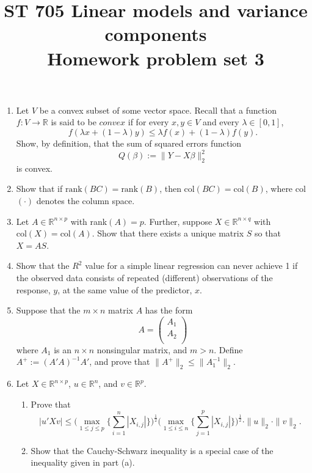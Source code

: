 \documentclass[11pt]{article}
\title{ST 705 Linear models and variance components \\ 
        Homework problem set 3}
\begin{document}
\maketitle

\begin{enumerate}

\item Let $V$ be a convex subset of some vector space.  Recall that a function $f : V \to \mathbb{R}$ is said to be $convex$ if for every $x, y \in V$ and every $\lambda \in [0,1]$,
\[
f(\lambda x + (1-\lambda)y) \le \lambda f(x) + (1-\lambda) f(y).
\]
Show, by definition, that the sum of squared errors function
\[
Q(\beta) := \|Y - X\beta\|_{2}^{2}
\]
is convex.

\item Show that if $\text{rank}(BC) = \text{rank}(B)$, then $\text{col}(BC) = \text{col}(B)$, where col$(\cdot)$ denotes the column space.

\item Let $A \in \mathbb{R}^{n\times p}$ with rank$(A) = p$.  Further, suppose  $X \in \mathbb{R}^{n\times q}$ with $\text{col}(X) = \text{col}(A)$.  Show that there exists a unique matrix $S$ so that $X = AS$.

\item Show that the $R^{2}$ value for a simple linear regression can never achieve 1 if the observed data consists of repeated (different) observations of the response, $y$, at the same value of the predictor, $x$.

\item Suppose that the $m\times n$ matrix $A$ has the form 
\[
A = 
\begin{pmatrix}
A_{1} \\
A_{2} \\
\end{pmatrix}
\]
where $A_{1}$ is an $n\times n$ nonsingular matrix, and $m > n$.  Define $A^{+} := (A'A)^{-1}A'$, and prove that $\|A^{+}\|_{2} \le \|A_{1}^{-1}\|_{2}$.

\item Let $X \in \mathbb{R}^{n\times p}$, $u \in \mathbb{R}^{n}$, and $v \in \mathbb{R}^{p}$.  
\begin{enumerate}
\item Prove that
\[
|u'Xv| \le \bigg(\max_{1\le j\le p}\Big\{\sum_{i=1}^{n}|X_{i,j}|\Big\}\bigg)^{\frac{1}{2}} \bigg(\max_{1\le i\le n}\Big\{\sum_{j=1}^{p}|X_{i,j}|\Big\}\bigg)^{\frac{1}{2}} \cdot \|u\|_{2} \cdot \|v\|_{2}.
\]
\item Show that the Cauchy-Schwarz inequality is a special case of the inequality given in part (a).
\end{enumerate}



\end{enumerate}
\end{document}
